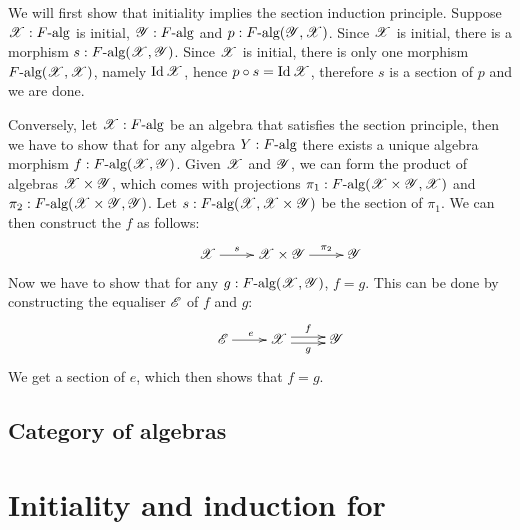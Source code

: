 \documentclass[a4paper,10pt]{article}
\begin{document}
We will first show that initiality implies the section induction
principle. Suppose $\mathscr{X} : F\mbox{-alg}$ is initial,
$\mathscr{Y} : F\mbox{-alg}$ and $p : F\mbox{-alg}(\mathscr{Y},\mathscr{X})$. Since
$\mathscr{X}$ is initial, there is a morphism
$s : F\mbox{-alg}(\mathscr{X},\mathscr{Y})$. Since $\mathscr{X}$ is initial, there
is only one morphism $F\mbox{-alg}(\mathscr{X},\mathscr{X})$, namely
$\operatorname*{Id}{\mathscr{X}}$, hence $p \circ s = \operatorname*{Id}{\mathscr{X}}$, therefore $s$ is a
section of $p$ and we are done.

Conversely, let $\mathscr{X} : F\mbox{-alg}$ be an algebra that satisfies
the section principle, then we have to show that for any algebra
$Y : F\mbox{-alg}$ there exists a unique algebra morphism
$f : F\mbox{-alg}(\mathscr{X},\mathscr{Y})$. Given $\mathscr{X}$ and $\mathscr{Y}$, we
can form the product of algebras $\mathscr{X} \times \mathscr{Y}$, which comes
with projections $\pi_1 : F\mbox{-alg}(\mathscr{X} \times \mathscr{Y}, \mathscr{X})$
and $\pi_2 : F\mbox{-alg}(\mathscr{X} \times \mathscr{Y}, \mathscr{Y})$. Let
$s : F\mbox{-alg}(\mathscr{X},\mathscr{X} \times \mathscr{Y})$ be the section of
$\pi_1$. We can then construct the $f$ as follows:
$$
\xymatrix{
  &\alg{X} \ar[r]^-{s} &\alg{X} \times \alg{Y} \ar[r]^-{\pi_2} &\alg{Y}
}
$$
Now we have to show that for any $g : F\mbox{-alg}(\mathscr{X},\mathscr{Y})$,
  $f = g$. This can be done by constructing the equaliser $\mathscr{E}$ of
  $f$ and $g$:
$$
\xymatrix{
  &\alg{E} \ar[r]^{e} &\alg{X} \ar@<-.5ex>[r]_-{g} \ar@<.5ex>[r]^-{f} &\alg{Y}
}
$$
We get a section of $e$, which then shows that $f = g$.

\subsection{Category of algebras}
\label{sec:oitalgcat}


\section{Initiality and induction for \hits}
\label{sec:hits}




\end{document}
